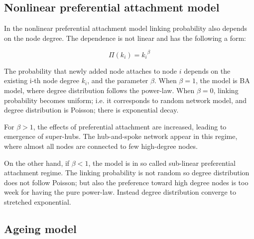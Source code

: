 
\subsection{Nonlinear preferential attachment model}

In the nonlinear preferential attachment model linking probability also depends on the node degree. The dependence is not linear and has the following a form:

\begin{equation}
\Pi(k_i) = {k_i}^{\beta}
\end{equation} 

The probability that newly added node attaches to node $i$ depends on the existing i-th node degree $k_i$, and the parameter $\beta$. When $\beta=1$, the model is BA model, where degree distribution follows the power-law. When $\beta=0$, linking probability becomes uniform; i.e. it corresponds to random network model, and degree distribution is Poisson; there is exponential decay. 

For $\beta>1$, the effects of preferential attachment are increased, leading to emergence of super-hubs. The hub-and-spoke network appear in this regime, where almost all nodes are connected to few high-degree nodes. %

On the other hand, if $\beta<1$, the model is in so called sub-linear preferential attachment regime. The linking probability is not random so degree distribution does not follow Poisson; but also the preference toward high degree nodes is too week for having the pure power-law. Instead degree distribution converge to stretched exponential.





\subsection{Ageing model}

